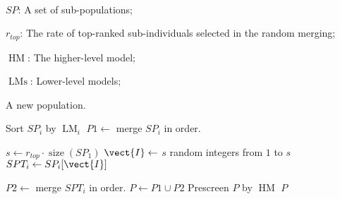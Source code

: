 \begin{algorithmic}[1]
    \REQUIRE~\\

    $SP$: A set of sub-populations;
    
    $r_{top}$: The rate of top-ranked sub-individuals selected in the random merging;


    $\operatorname{HM}$: The higher-level model;
    
    $\operatorname{LMs}$: Lower-level models;
    
    
    \ENSURE A new population.
    
        \STATE Sort $SP_i$ by $\operatorname{LM}_i$
    \ENDFOR
    \STATE $P1 \leftarrow$ merge $SP_i$ in order.

    \STATE $s \leftarrow r_{top} \cdot \operatorname{size}(SP_1)$
        \STATE $\vect{I} \leftarrow$ $s$ random integers from $1$ to $s$
        \STATE $SPT_i \leftarrow SP_i[\vect{I}]$
    \ENDFOR

    \STATE $P2 \leftarrow$ merge $SPT_i$ in order.
    \STATE $P \leftarrow P1 \cup P2$
    \STATE Prescreen $P$ by $\operatorname{HM}$
    \RETURN $P$
\end{algorithmic}